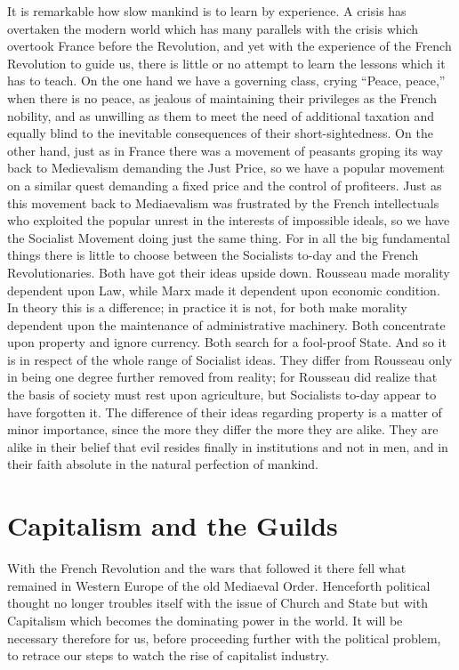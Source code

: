\documentclass{book}
\begin{document}
It is remarkable how slow mankind is to learn by experience. A crisis has overtaken the modern world which has many parallels with the crisis which overtook France before the Revolution, and yet with the experience of the French Revolution to guide us, there is little or no attempt to learn the lessons which it has to teach. On the one hand we have a governing class, crying “Peace, peace,” when there is no peace, as jealous of maintaining their privileges as the French nobility, and as unwilling as them to meet the need of additional taxation and equally blind to the inevitable consequences of their short-sightedness. On the other hand, just as in France there was a movement of peasants groping its way back to Medievalism demanding the Just Price, so we have a popular movement on a similar quest demanding a fixed price and the control of profiteers. Just as this movement back to Mediaevalism was frustrated by the French intellectuals who exploited the popular unrest in the interests of impossible ideals, so we have the Socialist Movement doing just the same thing. For in all the big fundamental things there is little to choose between the Socialists to-day and the French Revolutionaries. Both have got their ideas upside down. Rousseau made morality dependent upon Law, while Marx made it dependent upon economic condition. In theory this is a difference; in practice it is not, for both make morality dependent upon the maintenance of administrative machinery. Both concentrate upon property and ignore currency. Both search for a fool-proof State. And so it is in respect of the whole range of Socialist ideas. They differ from Rousseau only in being one degree further removed from reality; for Rousseau did realize that the basis of society must rest upon agriculture, but Socialists to-day appear to have forgotten it. The difference of their ideas regarding property is a matter of minor importance, since the more they differ the more they are alike. They are alike in their belief that evil resides finally in institutions and not in men, and in their faith absolute in the natural perfection of mankind.

\chapter{Capitalism and the Guilds}
\label{chapter-14}
With the French Revolution and the wars that followed it there fell what remained in Western Europe of the old Mediaeval Order. Henceforth political thought no longer troubles itself with the issue of Church and State but with Capitalism which becomes the dominating power in the world. It will be necessary therefore for us, before proceeding further with the political problem, to retrace our steps to watch the rise of capitalist industry.
\end{document}
